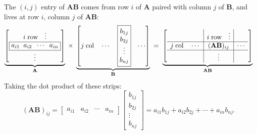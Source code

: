 The $(i, j)$ entry of $\mathbf{A}\mathbf{B}$ comes from row $i$ of $\mathbf{A}$ paired with column $j$ of $\mathbf{B}$, and lives at row $i$, column $j$ of $\mathbf{A}\mathbf{B}$:
\[
  \underbrace{
    \begin{bmatrix}
      i\; \text{row} \quad \vdots                     \\
      \boxed{a_{i1}\;\; a_{i2}\;\; \cdots\;\; a_{in}} \\
      \vdots
    \end{bmatrix}
  }_{\mathbf{A}}
  \;\times\;
  \underbrace{
    \begin{bmatrix}
      j\; \text{col} \quad \cdots &
      \boxed{
        \begin{matrix}
          b_{1j} \\ b_{2j} \\ \vdots \\ b_{nj}
        \end{matrix}
      }                           &
      \cdots
    \end{bmatrix}
  }_{\mathbf{B}}
  \;=\;
  \underbrace{\left[
      \begin{array}{c|c|c}
                                    & i\; \text{row} \quad \vdots &        \\ \hline
        j\; \text{col} \quad \cdots & (\mathbf{A}\mathbf{B})_{ij} & \cdots \\ \hline
                                    & \vdots                      &
      \end{array}
      \right]}_{\mathbf{A}\mathbf{B}}
\]
Taking the dot product of these strips:
\[
  (\mathbf{A}\mathbf{B})_{ij}
  =
  \begin{bmatrix}
    a_{i1} & a_{i2} & \cdots & a_{in}
  \end{bmatrix}
  \begin{bmatrix}
    b_{1j} \\ b_{2j} \\ \vdots \\ b_{nj}
  \end{bmatrix}
  = a_{i1} b_{1j} + a_{i2} b_{2j} + \cdots + a_{in} b_{nj}.
\]

